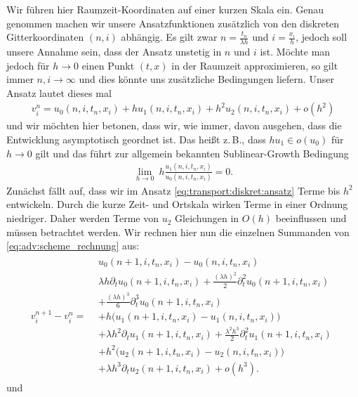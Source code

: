 Wir führen hier Raumzeit-Koordinaten auf einer kurzen Skala ein.
Genau genommen machen wir unsere Ansatzfunktionen zusätzlich von den diskreten Gitterkoordinaten $(n,i)$ abhängig.
Es gilt zwar $n = \frac {t_n} {\lambda h}$ und $i = \frac {x_i}{h}$, jedoch soll unsere Annahme sein, dass der Ansatz unstetig in $n$ und $i$ ist.
Möchte man jedoch für $h \to 0$ einen Punkt $(t,x)$ in der Raumzeit approximieren, so gilt immer $n,i \to \infty$ und dies könnte uns zusätzliche Bedingungen liefern.
Unser Ansatz lautet dieses mal
\begin{align}\label{eq:transport:diskret:ansatz}
v^n_i = u_0(n, i, t_n, x_i) + h u_1(n, i, t_n, x_i) + h^2 u_2(n, i, t_n, x_i) + o(h^2)
\end{align}
und wir möchten hier betonen, dass wir, wie immer, davon ausgehen, dass die Entwicklung asymptotisch geordnet ist.
Das heißt z.\,B., dass $h u_1 \in o(u_0)$ für $h \to 0$ gilt und das führt zur allgemein bekannten Sublinear-Growth Bedingung
\begin{align}\label{eq:transport:diskret:sublineargrowth}
\lim_{h \to 0} \: h \frac{u_1(n, i, t_n, x_i)}{u_0(n, i, t_n, x_i)} = 0.
\end{align}
Zunächst fällt auf, dass wir im Ansatz \eqref{eq:transport:diskret:ansatz} Terme bis $h^2$ entwickeln.
Durch die kurze Zeit- und Ortskala wirken Terme in einer Ordnung niedriger.
Daher werden Terme von $u_2$ Gleichungen in $O(h)$ beeinflussen und müssen betrachtet werden.
Wir rechnen hier nun die einzelnen Summanden von \eqref{eq:adv:scheme_rechnung} aus:
{
\begin{align} \label{eq:transport:diskret:diff1}
v^{n+1}_i - v^n_i =
\begin{split}
& u_0(n+1, i, t_n, x_i) - u_0(n, i, t_n, x_i)\\
&\lambda h \partial_t u_0(n+1, i, t_n, x_i) + \frac {(\lambda h)^2}{2} \partial^2_t u_0(n+1, i, t_n, x_i)\\
&+ \frac {(\lambda h)^3}{6} \partial^3_t u_0(n+1, i, t_n, x_i)\\
&+ h \bigl( u_1(n+1, i, t_n, x_i) - u_1(n, i, t_n, x_i) \bigr)\\
&+ \lambda h^2 \partial_t u_1(n+1, i, t_n, x_i) + \frac {\lambda^2 h^3}{2} \partial^2_t u_1(n+1, i, t_n, x_i)\\
&+ h^2 \bigl( u_2(n+1, i, t_n, x_i) - u_2(n, i, t_n, x_i) \bigr)\\
&+ \lambda h^3 \partial_t u_2(n+1, i, t_n, x_i) + o(h^3).
\end{split}
\end{align}
} und

